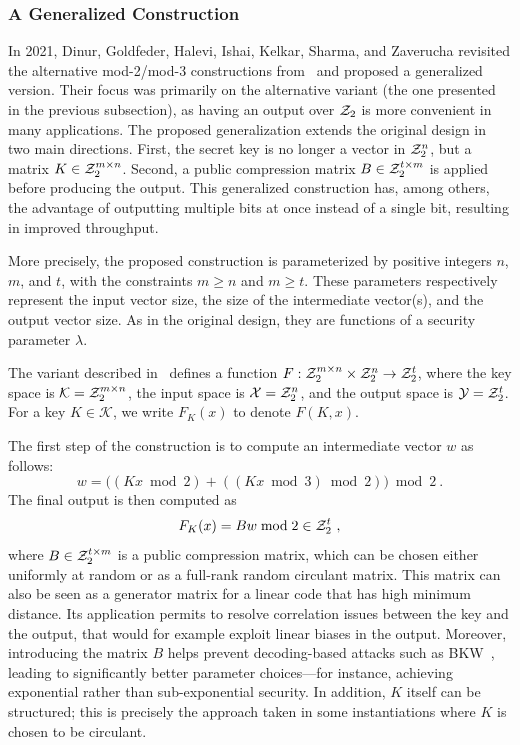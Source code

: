 \subsubsection{A Generalized Construction~\cite{C:DGHIKS21}}
\label{sec:bipsw_alt1}

In 2021, Dinur, Goldfeder, Halevi, Ishai, Kelkar, Sharma, and Zaverucha revisited the alternative mod-2/mod-3 constructions from~\cite{TCC:BIPSW18} and proposed a generalized version. Their focus was primarily on the alternative variant (the one presented in the previous subsection), as having an output over $\mathcal{Z}_2$ is more convenient in many applications. The proposed generalization extends the original design in two main directions. First, the secret key is no longer a vector in $\mathcal{Z}_2^n$, but a matrix $K \in \mathcal{Z}_2^{m \times n}$. Second, a public compression matrix $B \in \mathcal{Z}_2^{t \times m}$ is applied before producing the output. This generalized construction has, among others, the advantage of outputting multiple bits at once instead of a single bit, resulting in improved throughput. 

More precisely, the proposed construction is parameterized by positive integers $n$, $m$, and $t$, with the constraints $m \geq n$ and $m \geq t$. These parameters respectively represent the input vector size, the size of the intermediate vector(s), and the output vector size. As in the original design, they are functions of a security parameter $\lambda$.

The variant described in~\cite{C:DGHIKS21} defines a function $F : \mathcal{Z}_2^{m \times n} \times \mathcal{Z}_2^{n} \to \mathcal{Z}_2^t$, where the key space is $\mathcal{K} = \mathcal{Z}_2^{m \times n}$, the input space is $\mathcal{X} = \mathcal{Z}_2^n$, and the output space is $\mathcal{Y} = \mathcal{Z}_2^t$. For a key $K \in \mathcal{K}$, we write $F_K(x)$ to denote $F(K, x)$.

The first step of the construction is to compute an intermediate vector $w$ as follows:
\[
w = \big( (Kx \bmod 2) + \left((Kx \bmod 3) \bmod 2\right) \big) \bmod 2~.
\]
The final output is then computed as
\[
F_K(x) = Bw \bmod 2 \in \mathcal{Z}_2^t~,
\]
where $B \in \mathcal{Z}_2^{t \times m}$ is a public compression matrix, which can be chosen either uniformly at random or  as a full-rank random circulant matrix. This matrix can also be seen as a generator matrix for a linear code that has high minimum distance. Its application permits to resolve correlation issues between the key and the output, that would for example exploit linear biases in the output. Moreover, introducing the matrix $B$ helps prevent decoding-based attacks such as BKW~\cite{BKW}, leading to significantly better parameter choices—for instance, achieving exponential rather than sub-exponential security. In addition, $K$ itself can be structured; this is precisely the approach taken in some instantiations where $K$ is chosen to be circulant.


